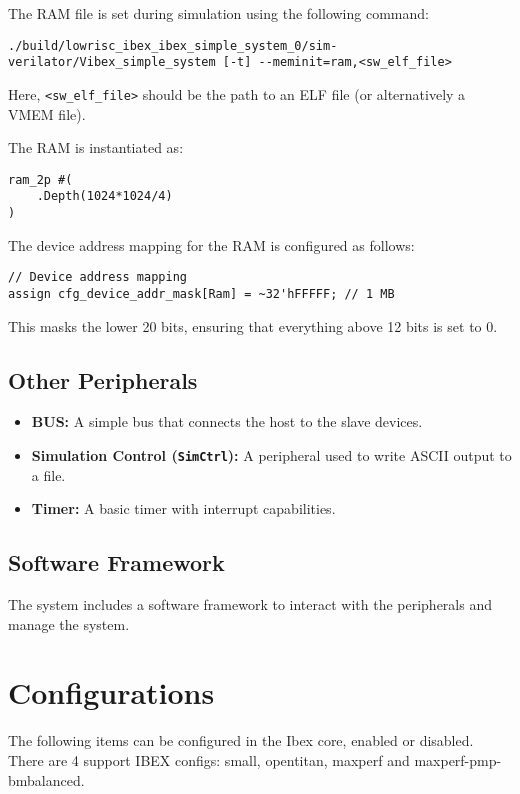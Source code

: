 \documentclass{article}
\begin{document}
The RAM file is set during simulation using the following command:
\begin{verbatim}
./build/lowrisc_ibex_ibex_simple_system_0/sim-verilator/Vibex_simple_system [-t] --meminit=ram,<sw_elf_file>
\end{verbatim}
Here, \texttt{<sw\_elf\_file>} should be the path to an ELF file (or alternatively a VMEM file).

The RAM is instantiated as:
\begin{verbatim}
ram_2p #(
    .Depth(1024*1024/4)
)
\end{verbatim}

The device address mapping for the RAM is configured as follows:
\begin{verbatim}
// Device address mapping
assign cfg_device_addr_mask[Ram] = ~32'hFFFFF; // 1 MB
\end{verbatim}
This masks the lower 20 bits, ensuring that everything above 12 bits is set to 0.

\subsection{Other Peripherals}
\begin{itemize}
    \item \textbf{BUS:} A simple bus that connects the host to the slave devices.
    \item \textbf{Simulation Control (\texttt{SimCtrl}):} A peripheral used to write ASCII output to a file.
    \item \textbf{Timer:} A basic timer with interrupt capabilities.
\end{itemize}

\subsection{Software Framework}
The system includes a software framework to interact with the peripherals and manage the system.

\section{Configurations}


The following items can be configured in the Ibex core, enabled or disabled. 
There are 4 support IBEX configs: small, opentitan, maxperf and maxperf-pmp-bmbalanced.
\end{document}
